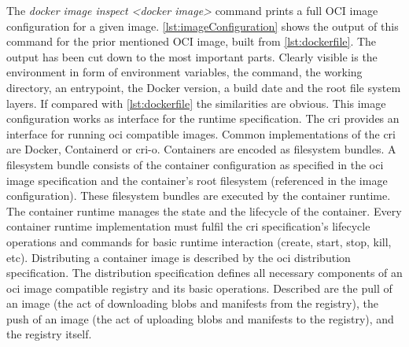 \documentclass[titlepage]{report}
\begin{document}
The \emph{docker image inspect <docker image>} command prints a full OCI image configuration for a given image. \autoref{lst:imageConfiguration} shows the output of this command
for the prior mentioned OCI image, built from \autoref{lst:dockerfile}. The output has been cut down to the most important parts. Clearly visible is the environment in form of environment
variables, the command, the working directory, an entrypoint, the Docker version, a build date and the root file system layers. If compared with \autoref{lst:dockerfile} the similarities are obvious. 
This image configuration works as interface for the runtime specification. The \gls{cri} provides an interface for running \gls{oci} compatible images. Common implementations of the \gls{cri} are
Docker, Containerd\cite{Containerd} or cri-o\cite{CRIO}. Containers are encoded as filesystem bundles. A filesystem bundle consists of the container configuration as specified in the \gls{oci} image specification
and the container's root filesystem (referenced in the image configuration)\cite{FilesystemBundle}. These filesystem bundles are executed by the container runtime. The container runtime manages the state and the lifecycle
of the container. Every container runtime implementation must fulfil the \gls{cri} specification's lifecycle operations and commands for basic runtime interaction (create, start, stop, kill, etc).
Distributing a container image is described by the \gls{oci} distribution specification. The distribution specification defines all necessary components of an \gls{oci} image compatible registry
and its basic operations. Described are the pull of an image (the act of downloading \glspl{blob} and manifests from the registry), the push of an image (the act of uploading \glspl{blob} and manifests to the registry),
and the registry itself. 
\end{document}
